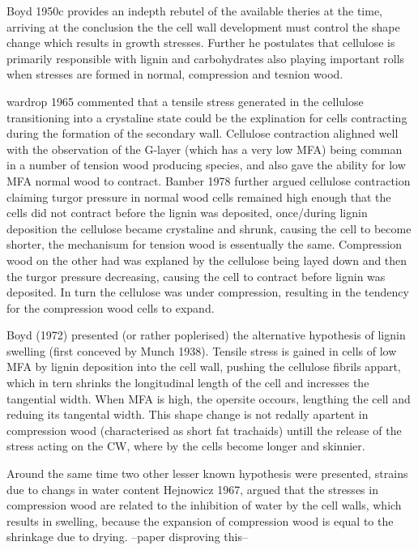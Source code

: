\documentclass{article}
\begin{document}
Boyd 1950c provides an indepth rebutel of the available theries at the time,
arriving at the conclusion the the cell wall development must control the shape
change which results in growth stresses. Further he postulates that cellulose
is primarily responsible with lignin and carbohydrates also playing important
rolls when stresses are formed in normal, compression and tesnion wood.

wardrop 1965 commented that a tensile stress generated in the cellulose
transitioning into a crystaline state could be the explination for cells
contracting during the formation of the secondary wall. Cellulose contraction
alighned well with the observation of the G-layer (which has  a very low
MFA) being comman in a number of tension wood producing species, and also gave
the ability for low MFA normal wood to contract. Bamber 1978 further argued
cellulose contraction claiming turgor pressure in normal wood cells remained
high enough that the cells did not contract before the lignin was deposited,
once/during lignin deposition the cellulose became crystaline and shrunk,
causing the cell to become shorter, the mechanisum for tension wood is
essentually the same. Compression wood on the other had was explaned by the
cellulose being layed down and then the turgor pressure decreasing, causing the
cell to contract before lignin was deposited. In turn the cellulose was under
compression, resulting in the tendency for the compression wood cells to
expand.

Boyd (1972) presented (or rather poplerised) the alternative hypothesis of
lignin swelling (first conceved by Munch 1938). Tensile stress is gained in
cells of low MFA by lignin deposition into the cell wall, pushing the cellulose fibrils
appart, which in tern shrinks the longitudinal length of the cell and incresses
the tangential width. When MFA is high, the opersite occours, lengthing the cell
and reduing its tangental width. This shape change is not redally apartent in
compression wood (characterised as short fat trachaids) untill the release of
the stress acting on the CW, where by the cells become longer and skinnier.

Around the same time two other lesser known hypothesis were presented,  strains
due to changs in water content Hejnowicz 1967, argued that the stresses in
compression wood are related to the inhibition of water by the cell walls,
which results in swelling, because the expansion of compression wood is equal to
the shrinkage due to drying. --paper disproving this--
\end{document}
